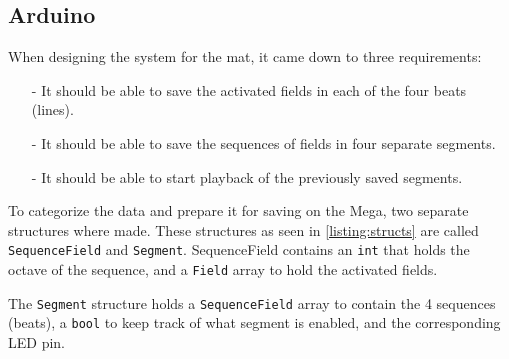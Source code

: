 	\subsection{Arduino}%
	When designing the system for the mat, it came down to three requirements:
	\begin{itemize}
		\item[-] It should be able to save the activated fields in each of the four beats (lines).
		\item[-] It should be able to save the sequences of fields in four separate segments.
		\item[-] It should be able to start playback of the previously saved segments.
	\end{itemize}
		To categorize the data and prepare it for saving on the Mega, two separate structures where made. These structures as seen in \autoref{listing:structs} are called \texttt{SequenceField} and \texttt{Segment}. SequenceField contains an \texttt{int} that holds the octave of the sequence, and a \texttt{Field} array to hold the activated fields.
		
		\noindent
		The \texttt{Segment} structure holds a \texttt{SequenceField} array to contain the 4 sequences (beats), a \texttt{bool} to keep track of what segment is enabled, and the corresponding LED pin.
		
